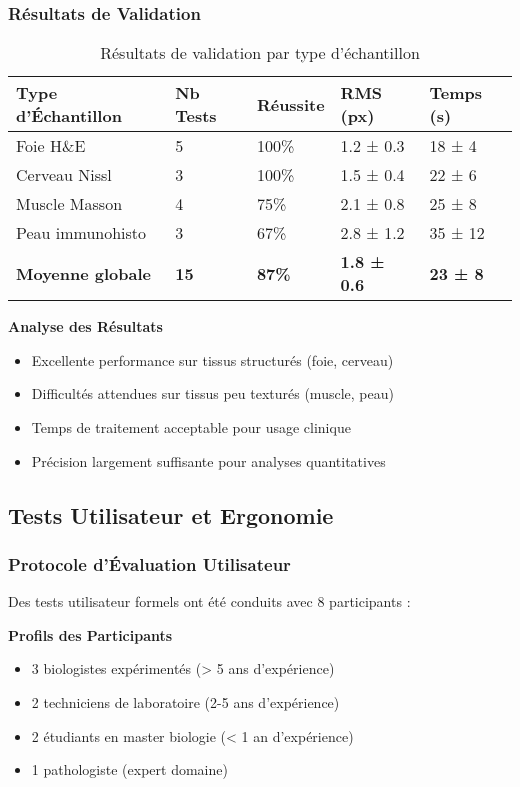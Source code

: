\documentclass[12pt,a4paper]{report}
\begin{document}
\subsubsection{Résultats de Validation}

\begin{table}[H]
\centering
\begin{tabular}{|p{3cm}|p{2cm}|p{2cm}|p{2cm}|p{2cm}|}
\hline
\textbf{Type d'Échantillon} & \textbf{Nb Tests} & \textbf{Réussite} & \textbf{RMS (px)} & \textbf{Temps (s)} \\
\hline
Foie H\&E & 5 & 100\% & 1.2 ± 0.3 & 18 ± 4 \\
\hline
Cerveau Nissl & 3 & 100\% & 1.5 ± 0.4 & 22 ± 6 \\
\hline
Muscle Masson & 4 & 75\% & 2.1 ± 0.8 & 25 ± 8 \\
\hline
Peau immunohisto & 3 & 67\% & 2.8 ± 1.2 & 35 ± 12 \\
\hline
\textbf{Moyenne globale} & \textbf{15} & \textbf{87\%} & \textbf{1.8 ± 0.6} & \textbf{23 ± 8} \\
\hline
\end{tabular}
\caption{Résultats de validation par type d'échantillon}
\end{table}

\textbf{Analyse des Résultats}
\begin{itemize}
\item Excellente performance sur tissus structurés (foie, cerveau)
\item Difficultés attendues sur tissus peu texturés (muscle, peau)
\item Temps de traitement acceptable pour usage clinique
\item Précision largement suffisante pour analyses quantitatives
\end{itemize}

\subsection{Tests Utilisateur et Ergonomie}

\subsubsection{Protocole d'Évaluation Utilisateur}

Des tests utilisateur formels ont été conduits avec 8 participants :

\textbf{Profils des Participants}
\begin{itemize}
\item 3 biologistes expérimentés (> 5 ans d'expérience)
\item 2 techniciens de laboratoire (2-5 ans d'expérience)
\item 2 étudiants en master biologie (< 1 an d'expérience)
\item 1 pathologiste (expert domaine)
\end{itemize}
\end{document}
